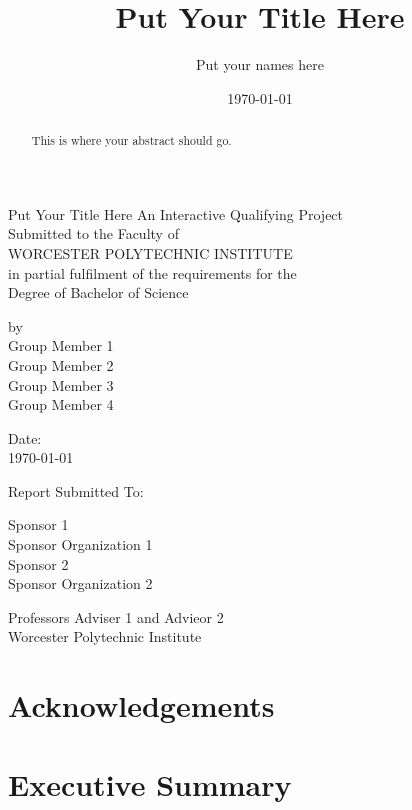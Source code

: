 \documentclass[a4paper, 12pt, american]{article}
\title{Put Your Title Here}
\author{Put your names here}
\date{\today}
\begin{document}

\begin{center}
{\huge Put Your Title Here}
\vfill
An Interactive Qualifying Project \\
Submitted to the Faculty of \\
WORCESTER POLYTECHNIC INSTITUTE \\
in partial fulfilment of the requirements for the \\
Degree of Bachelor of Science\par
\vfill
by \\
Group Member 1 \\
Group Member 2 \\
Group Member 3 \\
Group Member 4\par
\vfill
Date: \\
\today\par
\vfill
Report Submitted To:\par
\end{center}
\vspace{\baselineskip}
\begin{flushright} %
	Sponsor 1 \\
	Sponsor Organization 1 \\
	\vspace{\baselineskip}
	Sponsor 2 \\
	Sponsor Organization 2\par
	\vspace{\baselineskip}
	Professors Adviser 1 and Advieor 2 \\
	Worcester Polytechnic Institute
\end{flushright}
\vfill
\newpage

\onehalfspacing %
\begin{abstract}
	This is where your abstract should go.
	\lipsum[3]
\end{abstract}
\newpage

\section*{Acknowledgements}

\lipsum[3]

\newpage

\section*{Executive Summary}
\end{document}
